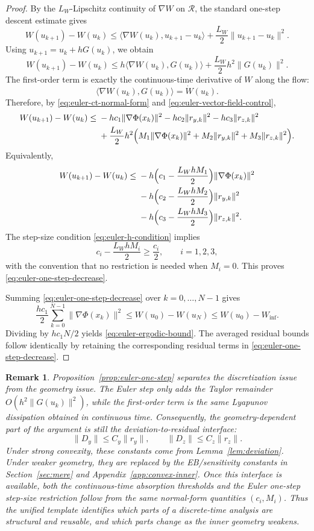 \documentclass{article}
\newtheorem{remark}[theorem]{Remark}
\newcommand{\1}{\mathbf{1}}
\begin{document}
\begin{proof}
By the $L_W$-Lipschitz continuity of $\nabla W$ on $\mathcal R$, the standard
one-step descent estimate gives
\[
W(u_{k+1})-W(u_k)
\le
\langle \nabla W(u_k),u_{k+1}-u_k\rangle
+
\frac{L_W}{2}\|u_{k+1}-u_k\|^2.
\]
Using $u_{k+1}=u_k+hG(u_k)$, we obtain
\[
W(u_{k+1})-W(u_k)
\le
h\langle \nabla W(u_k),G(u_k)\rangle
+
\frac{L_W}{2}h^2\|G(u_k)\|^2.
\]
The first-order term is exactly the continuous-time derivative of $W$ along the
flow:
\[
\langle \nabla W(u_k),G(u_k)\rangle=\dot W(u_k).
\]
Therefore, by \eqref{eq:euler-ct-normal-form} and
\eqref{eq:euler-vector-field-control},
\[
\begin{aligned}
W(u_{k+1})-W(u_k)
\le\;&
-hc_1\|\nabla\Phi(x_k)\|^2
-hc_2\|r_{y,k}\|^2
-hc_3\|r_{z,k}\|^2\\
&+
\frac{L_W}{2}h^2
\Bigl(
M_1\|\nabla\Phi(x_k)\|^2
+
M_2\|r_{y,k}\|^2
+
M_3\|r_{z,k}\|^2
\Bigr).
\end{aligned}
\]
Equivalently,
\[
\begin{aligned}
W(u_{k+1})-W(u_k)
\le\;&
-h\Bigl(c_1-\frac{L_WhM_1}{2}\Bigr)\|\nabla\Phi(x_k)\|^2\\
&-
h\Bigl(c_2-\frac{L_WhM_2}{2}\Bigr)\|r_{y,k}\|^2\\
&-
h\Bigl(c_3-\frac{L_WhM_3}{2}\Bigr)\|r_{z,k}\|^2.
\end{aligned}
\]
The step-size condition \eqref{eq:euler-h-condition} implies
\[
c_i-\frac{L_WhM_i}{2}\ge \frac{c_i}{2},
\qquad i=1,2,3,
\]
with the convention that no restriction is needed when $M_i=0$. This proves
\eqref{eq:euler-one-step-decrease}.

Summing \eqref{eq:euler-one-step-decrease} over $k=0,\ldots,N-1$ gives
\[
\frac{hc_1}{2}
\sum_{k=0}^{N-1}\|\nabla\Phi(x_k)\|^2
\le
W(u_0)-W(u_N)
\le
W(u_0)-W_{\inf}.
\]
Dividing by $hc_1N/2$ yields \eqref{eq:euler-ergodic-bound}. The averaged
residual bounds follow identically by retaining the corresponding residual
terms in \eqref{eq:euler-one-step-decrease}.
\end{proof}

\begin{remark}
Proposition~\ref{prop:euler-one-step} separates the discretization issue from
the geometry issue. The Euler step only adds the Taylor remainder
$O(h^2\|G(u_k)\|^2)$, while the first-order term is the same Lyapunov
dissipation obtained in continuous time. Consequently, the geometry-dependent
part of the argument is still the deviation-to-residual interface:
\[
\|D_y\|\le C_y\|r_y\|,
\qquad
\|D_z\|\le C_z\|r_z\|.
\]
Under strong convexity, these constants come from Lemma~\ref{lem:deviation}.
Under weaker geometry, they are replaced by the EB/sensitivity constants in
Section~\ref{sec:mere} and Appendix~\ref{app:convex-inner}. Once this interface
is available, both the continuous-time absorption thresholds and the Euler
one-step step-size restriction follow from the same normal-form quantities
$(c_i,M_i)$. Thus the unified template identifies which parts of a discrete-time
analysis are structural and reusable, and which parts change as the inner
geometry weakens.
\end{remark} 
\end{document}
